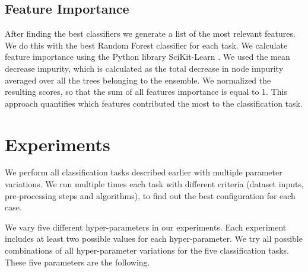 \documentclass[a4paper,fleqn,usenatbib]{mnras}
\begin{document}
\subsection{Feature Importance} \label{subsection_importances}

After finding the best classifiers we generate a list of the most
relevant features. 
We do this with the best Random Forest classifier for each task.
We calculate feature importance using the Python library 
SciKit-Learn \citep{1201.0490}. We used the mean decrease impurity, 
which is calculated as the total decrease in node impurity averaged over all the trees belonging to
the ensemble.
We normalized the resulting scores, so that the sum of all features
importance is equal to 1.
This approach quantifies which features contributed the most to the
classification task.  

\section{Experiments} \label{section_experimentation}

We perform all classification tasks described earlier with multiple
parameter variations.  
We run multiple times each task with different criteria 
(dataset inputs, pre-processing steps and algorithms), 
to find out the best configuration for each case.

We vary five different hyper-parameters in our experiments.
Each experiment includes at least two possible values for each
hyper-parameter.
We try all possible combinations of all hyper-parameter variations 
for the five classification tasks. 
These five parameters are the following. 
\end{document}
